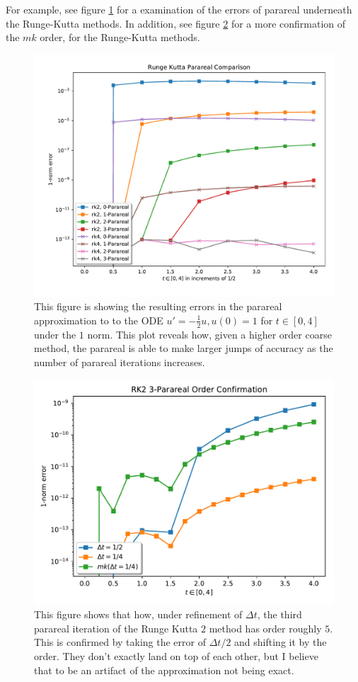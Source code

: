 For example, see figure \ref{fig:conv_rk} for a examination of the errors of
parareal underneath the Runge-Kutta methods. In addition, see figure
\ref{fig:order_conf} for a more confirmation of the $mk$ order, for the
Runge-Kutta methods.

\begin{figure}[H]
  \centering
  \includegraphics[width=.75\textwidth]{./resources/runge_kutta_parareal}
  \caption{This figure is showing the resulting errors in the parareal
    approximation to to the ODE $u' = -\frac{1}{2}u, u(0) = 1$ for $t \in [0,
    4]$ under the $1$ norm. This plot reveals how, given a higher order coarse
    method, the parareal is able to make larger jumps of accuracy as the number
    of parareal iterations increases.}\label{fig:conv_rk}
\end{figure}

\begin{figure}[H]
  \centering
  \includegraphics[width=.75\textwidth]{./resources/rk2_order_conf}
  \caption{This figure shows that how, under refinement of $\Delta t$, the third
    parareal iteration of the Runge Kutta $2$ method has order roughly
    $5$. This is confirmed by taking the error of $\Delta t/2$ and shifting it
    by the order. They don't exactly land on top of each other, but I believe
    that to be an artifact of the approximation not being exact.}\label{fig:order_conf}
\end{figure}
